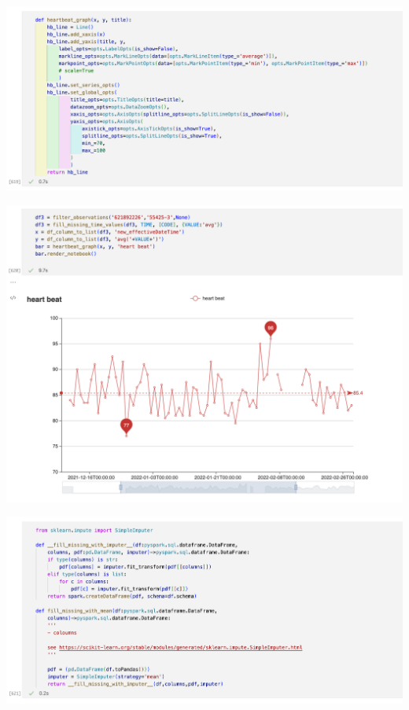 \documentclass[11pt, oneside]{article}
\begin{document}
\begin{center}
\includegraphics[scale=0.4]{4_graph.png}
\end{center}
\begin{center}
\includegraphics[scale=0.4]{4_hb.png}
\end{center}
\begin{center}
\includegraphics[scale=0.4]{4_sklearn.png}
\end{center}
\end{document}
